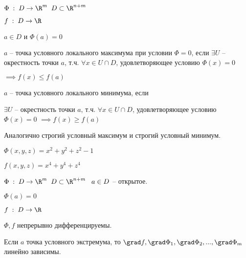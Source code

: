 
\begin{definition}\thmslashn
	
	$\Phi \; :\; D \to \R^m \;\; D \subset \R^{n+m}$
	
	$f \; : \; D \to \R$
	
	$a \in D$ и $\Phi(a) = 0$
	
	$a$ -- точка условного локального максимума при условии $\Phi = 0$, если $\exists U$ -- окрестность точки $a$, т.ч. $\forall x \in U\cap D$, удовлетворяющее условию $\Phi(x) = 0$
	
	$\implies f(x) \le f(a)$
	
	$a$ -- точка условного локального минимума, если
	
	$\exists U$ -- окрестность точки $a$, т.ч. $\forall x \in U\cap D$, удовлетворяющее условию $\Phi(x) = 0$ $\implies f(x) \ge f(a)$
	
	
	Аналогично строгий условный максимум и строгий условный минимум.
\end{definition}

\begin{example}\thmslashn

	$\Phi(x, y, z) = x^2 + y^2 + z^2 - 1$
	
	$f(x,y,z) = x^4 + y^4 + z^4$
\end{example}

\begin{theorem}\thmslashn
	
	
	$\Phi \; :\; D \to \R^m \;\; D \subset \R^{n+m} \;\;\; a \in D$ -- открытое. 
	
	$\Phi(a) = 0$
		
	$f \; : \; D \to \R$
	
	$\Phi, f$ непрерывно дифференцируемы.
	
	Если $a$ точка условного экстремума, то $\grad f, \grad \Phi_1, \grad \Phi_2, ..., \grad \Phi_m$ линейно зависимы.
\end{theorem}

